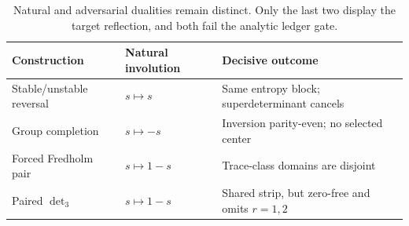 \begin{table}[t]
\centering
\small
\begin{tabularx}{0.98\textwidth}{L{0.20\textwidth}L{0.20\textwidth}X}
\toprule
Construction & Natural involution & Decisive outcome \\
\midrule
Stable/unstable reversal & $s\mapsto s$ &
Same entropy block; superdeterminant cancels \\
Group completion & $s\mapsto-s$ &
Inversion parity-even; no selected center \\
Forced Fredholm pair & $s\mapsto1-s$ &
Trace-class domains are disjoint \\
Paired $\det_3$ & $s\mapsto1-s$ &
Shared strip, but zero-free and omits $r=1,2$ \\
\bottomrule
\end{tabularx}
\caption{Natural and adversarial dualities remain distinct. Only the last
two display the target reflection, and both fail the analytic ledger gate.}
\label{tab:duality}
\end{table}
